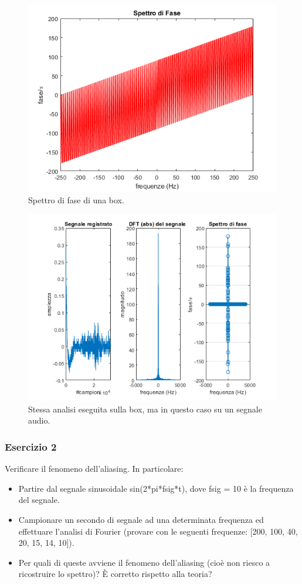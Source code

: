 \documentclass[a4paper]{article}
\begin{document}
	\begin{figure}[!htp]
		\centering
		\includegraphics[width=.9\textwidth]{img/lab/lab5-4.png}
		\caption{Spettro di fase di una box.}
	\end{figure}
	\begin{figure}[!htp]
		\centering
		\includegraphics[width=.9\textwidth]{img/lab/lab5-5.png}
		\caption{Stessa analisi eseguita sulla box, ma in questo caso su un segnale audio.}
	\end{figure}\newpage
	
	\subsubsection{Esercizio 2}
	
	Verificare il fenomeno dell'aliasing. In particolare:
	\begin{itemize}
		\item Partire dal segnale sinusoidale \textsf{sin(2*pi*fsig*t)}, dove \textsf{fsig = 10} è la frequenza del segnale.
		
		\item Campionare un secondo di segnale ad una determinata frequenza ed effettuare l'analisi di Fourier (provare con le seguenti frequenze: [200, 100, 40, 20, 15, 14, 10]).
		
		\item Per quali di queste avviene il fenomeno dell'aliasing (cioè non riesco a ricostruire lo spettro)? È corretto rispetto alla teoria?
	\end{itemize}
	
\end{document}
